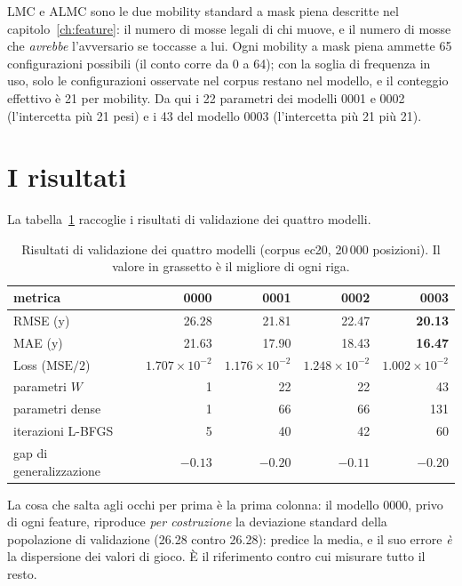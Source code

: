 LMC e ALMC sono le due mobility standard a mask piena descritte nel
capitolo~\ref{ch:feature}: il numero di mosse legali di chi muove, e il
numero di mosse che \emph{avrebbe} l'avversario se toccasse a lui.
Ogni mobility a mask piena ammette 65 configurazioni possibili (il
conto corre da 0 a 64); con la soglia di frequenza in uso, solo le
configurazioni osservate nel corpus restano nel modello, e il conteggio
effettivo è 21 per mobility. Da qui i 22 parametri dei modelli 0001 e
0002 (l'intercetta più 21 pesi) e i 43 del modello 0003 (l'intercetta
più 21 più 21).

\section{I risultati}

La tabella~\ref{tab:feature-base-risultati} raccoglie i risultati di
validazione dei quattro modelli.

\begin{table}[ht]
\centering
\begin{tabular}{lrrrr}
\toprule
metrica & 0000 & 0001 & 0002 & 0003 \\
\midrule
RMSE (y)           & 26.28  & 21.81  & 22.47  & \textbf{20.13} \\
MAE (y)            & 21.63  & 17.90  & 18.43  & \textbf{16.47} \\
Loss ($\mathrm{MSE}/2$) & $1.707\times10^{-2}$ & $1.176\times10^{-2}$ & $1.248\times10^{-2}$ & \textbf{$1.002\times10^{-2}$} \\
parametri $W$      & 1      & 22     & 22     & 43 \\
parametri dense    & 1      & 66     & 66     & 131 \\
iterazioni L-BFGS  & 5      & 40     & 42     & 60 \\
gap di generalizzazione & $-0.13$ & $-0.20$ & $-0.11$ & $-0.20$ \\
\bottomrule
\end{tabular}
\caption{Risultati di validazione dei quattro modelli (corpus ec20, 20\,000
posizioni). Il valore in grassetto è il migliore di ogni riga.}
\label{tab:feature-base-risultati}
\end{table}

La cosa che salta agli occhi per prima è la prima colonna: il modello
0000, privo di ogni feature, riproduce \emph{per costruzione} la
deviazione standard della popolazione di validazione (26.28 contro
26.28): predice la media, e il suo errore \emph{è} la dispersione dei
valori di gioco. È il riferimento contro cui misurare tutto il resto.

